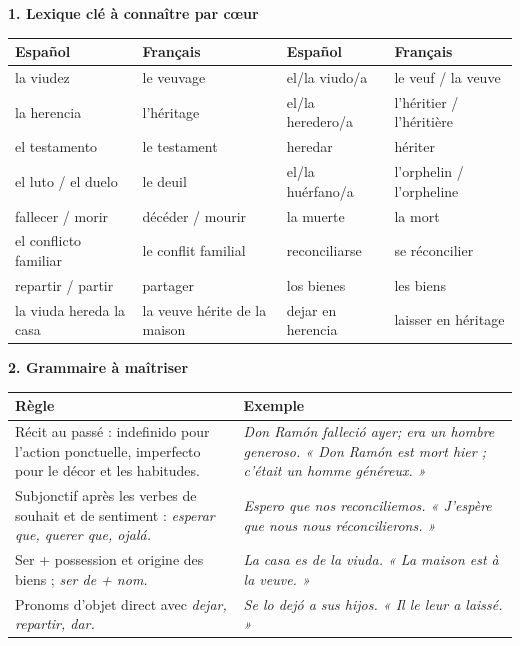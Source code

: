 \documentclass[11pt]{article}
\newcommand{\cle}[1]{{\popxbold\color{popdark}#1}}
\newcommand{\esp}[1]{\ifmmode\text{\textit{#1}}\else\begingroup\selectlanguage{spanish}\itshape #1\endgroup\fi}
\begin{document}
\begin{bilan}
\textbf{1. Lexique clé à connaître par cœur}
\begin{center}
\begin{tabularx}{\linewidth}{|X|X|X|X|}
\hline
\rowcolor{popblueL} \textbf{Español} & \textbf{Français} & \textbf{Español} & \textbf{Français} \\
\hline
la viudez & le veuvage & el/la viudo/a & le veuf / la veuve \\
\hline
la herencia & l'héritage & el/la heredero/a & l'héritier / l'héritière \\
\hline
el testamento & le testament & heredar & hériter \\
\hline
el luto / el duelo & le deuil & el/la huérfano/a & l'orphelin / l'orpheline \\
\hline
fallecer / morir & décéder / mourir & la muerte & la mort \\
\hline
el conflicto familiar & le conflit familial & reconciliarse & se réconcilier \\
\hline
repartir / partir & partager & los bienes & les biens \\
\hline
la viuda hereda la casa & la veuve hérite de la maison & dejar en herencia & laisser en héritage \\
\hline
\end{tabularx}
\end{center}

\textbf{2. Grammaire à maîtriser}
\begin{center}
\begin{tabularx}{\linewidth}{|X|X|}
\hline
\rowcolor{popgreenL} \textbf{Règle} & \textbf{Exemple} \\
\hline
Récit au passé : \cle{indefinido} pour l'action ponctuelle, \cle{imperfecto} pour le décor et les habitudes. & \esp{Don Ramón falleció ayer; era un hombre generoso.} « Don Ramón est mort hier ; c'était un homme généreux. » \\
\hline
\cle{Subjonctif} après les verbes de souhait et de sentiment : \esp{esperar que, querer que, ojalá}. & \esp{Espero que nos reconciliemos.} « J'espère que nous nous réconcilierons. » \\
\hline
\cle{Ser} + possession et origine des biens ; \esp{ser de + nom}. & \esp{La casa es de la viuda.} « La maison est à la veuve. » \\
\hline
Pronoms d'objet direct avec \esp{dejar, repartir, dar}. & \esp{Se lo dejó a sus hijos.} « Il le leur a laissé. » \\
\hline
\end{tabularx}
\end{center}


\end{bilan}
\end{document}
